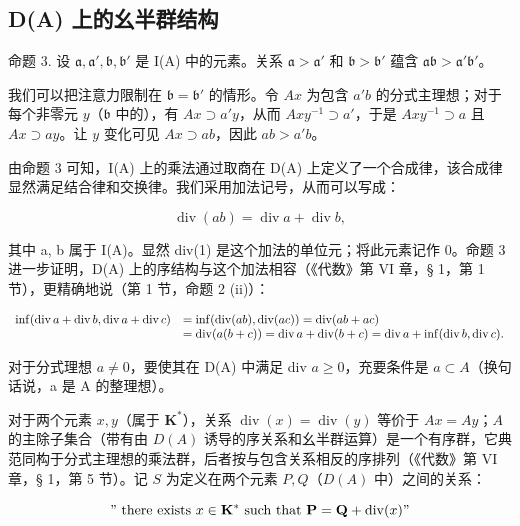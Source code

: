 \subsection{D(A) 上的幺半群结构}

命题 3. 设 \(\mathfrak{a}, \mathfrak{a}', \mathfrak{b}, \mathfrak{b}'\) 是 I(A) 中的元素。关系 \(\mathfrak{a} > \mathfrak{a}'\) 和 \(\mathfrak{b} > \mathfrak{b}'\) 蕴含 \(\mathfrak{ab} > \mathfrak{a}'\mathfrak{b}'\)。

我们可以把注意力限制在 \(\mathfrak{b} = \mathfrak{b}'\) 的情形。令 \(Ax\) 为包含 \(a'b\) 的分式主理想；对于每个非零元 \(y\)（\(\mathfrak{b}\) 中的），有 \(Ax \supset a'y\)，从而 \(Axy^{-1} \supset a'\)，于是 \(Axy^{-1} \supset a\) 且 \(Ax \supset ay\)。让 \(y\) 变化可见 \(Ax \supset ab\)，因此 \(ab > a'b\)。

由命题 3 可知，I(A) 上的乘法通过取商在 D(A) 上定义了一个合成律，该合成律显然满足结合律和交换律。我们采用加法记号，从而可以写成：

\[
\operatorname{div} (a b) = \operatorname{div} a + \operatorname{div} b,\tag{2}
\]

其中 a, b 属于 I(A)。显然 div(1) 是这个加法的单位元；将此元素记作 0。命题 3 进一步证明，D(A) 上的序结构与这个加法相容（《代数》第 VI 章，§ 1，第 1 节），更精确地说（第 1 节，命题 2 (ii)）：

\[
\begin{array}{r l} \inf (\operatorname{div} a + \operatorname{div} b, \operatorname{div} a + \operatorname{div} c) & = \inf (\operatorname{div} (a b), \operatorname{div} (a c)) = \operatorname{div} (a b + a c) \\ & = \operatorname{div} (a (b + c)) = \operatorname{div} a + \operatorname{div} (b + c) = \operatorname{div} a + \inf (\operatorname{div} b, \operatorname{div} c). \end{array}
\]

对于分式理想 \(a \neq 0\)，要使其在 D(A) 中满足 div \(a \geqslant 0\)，充要条件是 \(a \subset A\)（换句话说，a 是 A 的整理想）。

对于两个元素 \(x, y\)（属于 \(\mathbf{K}^*\)），关系 \(\operatorname{div}(x) = \operatorname{div}(y)\) 等价于 \(A x = A y\)；\(A\) 的主除子集合（带有由 \(D(A)\) 诱导的序关系和幺半群运算）是一个有序群，它典范同构于分式主理想的乘法群，后者按与包含关系相反的序排列（《代数》第 VI 章，§ 1，第 5 节）。记 \(S\) 为定义在两个元素 \(P, Q\)（\(D(A)\) 中）之间的关系：

\[
" \text { there   exists } x \in \mathbf {K} ^ {*} \text { such   that } \mathbf {P} = \mathbf {Q} + \operatorname{div} (x)"
\]


